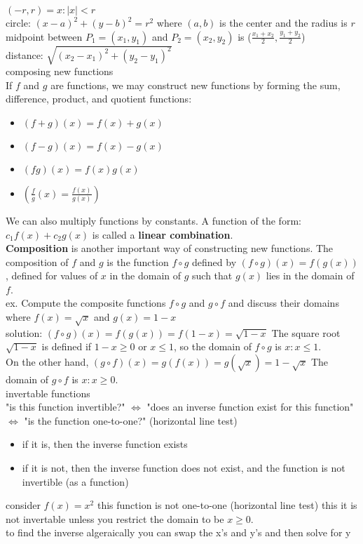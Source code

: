 \documentclass{article}
\begin{document}
$(-r, r) = {x : \lvert x\rvert < r}$\\

circle: $(x-a)^2 + (y-b)^2 = r^2$ where $(a, b)$ is the center and the radius is $r$\\

midpoint between $P_1 = (x_1, y_1)$ and $P_2 = (x_2, y_2)$ is ($\frac{x_1 + x_2}{2} , \frac{y_1 + y_2}{2}$)\\

distance: $\sqrt{(x_2 - x_1)^2 + (y_2 - y_1)^2}$\\

composing new functions\\
	If $f$ and $g$ are functions, we may construct new functions by forming the sum, difference, product, and quotient functions:\\
	\begin{itemize}
		\item $(f + g)(x) = f(x) + g(x)$
		\item $(f - g)(x) = f(x) - g(x)$
		\item $(fg)(x) = f(x)g(x)$
		\item $(\frac{f}{g}(x) = \frac{f(x)}{g(x)})$
	\end{itemize}
	We can also multiply functions by constants. A function of the form: $c_1f(x) + c_2g(x)$ is called a \textbf{linear combination}.\\
	\textbf{Composition} is another important way of constructing new functions. The composition of $f$ and $g$ is the function $f \circ g$ defined by $(f \circ g)(x) = f(g(x))$, defined for values of $x$ in the domain of $g$ such that $g(x)$ lies in the domain of $f$.\\
	ex. Compute the composite functions $f \circ g$ and $g \circ f$ and discuss their domains where $f(x) = \sqrt{x}$ and $g(x) = 1 - x$\\
	solution: $(f \circ g)(x) = f(g(x)) = f(1 - x) = \sqrt{1 - x}$ The square root $\sqrt{1 - x}$ is defined if $1 - x \geq 0$ or $x \leq 1$, so the domain of $f \circ g$ is ${x : x \leq 1}$.\\
	On the other hand, $(g \circ f)(x) = g(f(x)) = g(\sqrt{x}) = 1 - \sqrt{x}$ The domain of $g \circ f$ is ${x : x \geq 0}$.\\


invertable functions\\
	"is this function invertible?" $\Leftrightarrow$ "does an inverse function exist for this function" $\Leftrightarrow$ "is the function one-to-one?" (horizontal line test)
	\begin{itemize}
		\item if it is, then the inverse function exists
		\item if it is not, then the inverse function does not exist, and the function is not invertible (as a function)
	\end{itemize}
	consider $f(x) = x^2$ this function is not one-to-one (horizontal line test) this it is not invertable unless you restrict the domain to be $x \geq 0$.\\
	to find the inverse algeraically you can swap the x's and y's and then solve for y\\
\end{document}

